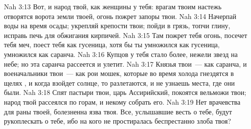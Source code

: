 \vs Nah 3:13 Вот, и народ твой, как женщины у тебя: врагам твоим настежь отворятся ворота земли твоей, огонь пожрет запоры твои.
\vs Nah 3:14 Начерпай воды на время осады; укрепляй крепости твои; пойди в грязь, топчи глину, исправь печь для обжигания кирпичей.
\vs Nah 3:15 Там пожрет тебя огонь, посечет тебя меч, поест тебя как гусеница, хотя бы ты умножился как гусеница, умножился как саранча.
\vs Nah 3:16 Купцов у тебя стало более, нежели звезд на небе; но эта саранча рассеется и улетит.
\vs Nah 3:17 Князья твои~--- как саранча, и военачальники твои~--- как рои мошек, которые во время холода гнездятся в щелях , и когда взойдет солнце, то разлетаются, и не узнаешь места, где они были.
\vs Nah 3:18 Спят пастыри твои, царь Ассирийский, покоятся вельможи твои; народ твой рассеялся по горам, и некому собрать его.
\vs Nah 3:19 Нет врачевства для раны твоей, болезненна язва твоя. Все, услышавшие весть о тебе, будут рукоплескать о тебе, ибо на кого не простиралась беспрестанно злоба твоя?
